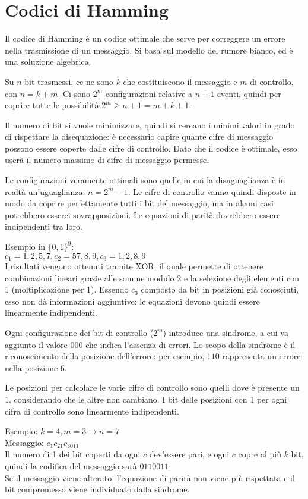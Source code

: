 \section{Codici di Hamming}
Il codice di Hamming è un codice ottimale che serve per correggere un errore nella trasmissione di un messaggio. Si basa sul modello del rumore bianco, ed è una soluzione algebrica.

Su $n$ bit trasmessi, ce ne sono $k$ che costituiscono il messaggio e $m$ di controllo, con $n = k + m$. Ci sono $2^m$ configurazioni relative a $n + 1$ eventi, quindi per coprire tutte le possibilità $2^m \geq n + 1 = m + k + 1$.

Il numero di bit si vuole minimizzare, quindi si cercano i minimi valori in grado di rispettare la disequazione: è necessario capire quante cifre di messaggio possono essere coperte dalle cifre di controllo. Dato che il codice è ottimale, esso userà il numero massimo di cifre di messaggio permesse.

Le configurazioni veramente ottimali sono quelle in cui la disuguaglianza è in realtà un'uguaglianza: $n = 2^m - 1$. Le cifre di controllo vanno quindi disposte in modo da coprire perfettamente tutti i bit del messaggio, ma in alcuni casi potrebbero esserci sovrapposizioni. Le equazioni di parità dovrebbero essere indipendenti tra loro. 

Esempio in $\{0, 1\}^9$: \\
$c_1 = 1, 2, 5, 7, c_2 = 5 7, 8, 9, c_3 = 1, 2, 8, 9$ \\
I risultati vengono ottenuti tramite XOR, il quale permette di ottenere combinazioni lineari grazie alle somme modulo 2 e la selezione degli elementi con 1 (moltiplicazione per 1). Essendo $c_3$ composto da bit in posizioni già conosciuti, esso non dà informazioni aggiuntive: le equazioni devono quindi essere linearmente indipendenti.

Ogni configurazione dei bit di controllo ($2^m$) introduce una sindrome, a cui va aggiunto il valore 000 che indica l'assenza di errori. Lo scopo della sindrome è il riconoscimento della posizione dell'errore: per esempio, $110$ rappresenta un errore nella posizione 6.

Le posizioni per calcolare le varie cifre di controllo sono quelli dove è presente un 1, considerando che le altre non cambiano. I bit delle posizioni con 1 per ogni cifra di controllo sono linearmente indipendenti. 

Esempio: $k = 4, m = 3 \rightarrow n = 7$ \\
Messaggio: $c_1c_21c_3011$ \\ 
Il numero di 1 dei bit coperti da ogni $c$ dev'essere pari, e ogni $c$ copre al più $k$ bit, quindi la codifica del messaggio sarà $0110011$. \\
Se il messaggio viene alterato, l'equazione di parità non viene più rispettata e il bit compromesso viene individuato dalla sindrome. 

